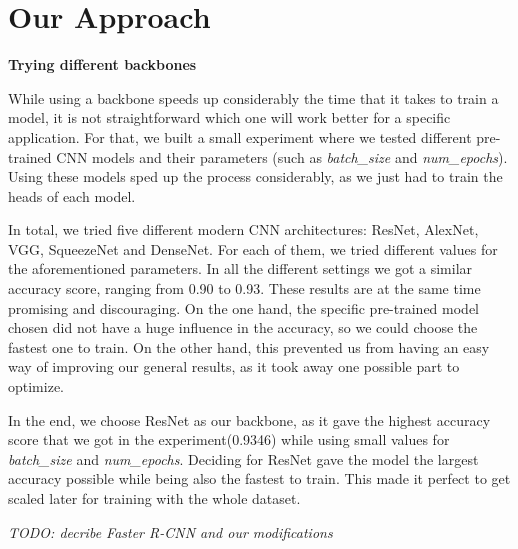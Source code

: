 \section{Our Approach}

\textbf{Trying different backbones}

While using a backbone speeds up considerably the time that it takes to train a model, it is not straightforward which one will work better for a specific application. For that, we built a small experiment where we tested different pre-trained CNN models and their parameters (such as \textit{batch_size} and \textit{num_epochs}). Using these models sped up the process considerably, as we just had to train the heads of each model.

In total, we tried five different modern CNN architectures: ResNet, AlexNet, VGG, SqueezeNet and DenseNet. For each of them, we tried different values for the aforementioned parameters. In all the different settings we got a similar accuracy score, ranging from 0.90 to 0.93. These results are at the same time promising and discouraging. On the one hand, the specific pre-trained model chosen did not have a huge influence in the accuracy, so we could choose the fastest one to train. On the other hand, this prevented us from having an easy way of improving our general results, as it took away one possible part to optimize. 

In the end, we choose ResNet as our backbone, as it gave the highest accuracy score that we got in the experiment(0.9346) while using small values for \textit{batch_size} and \textit{num_epochs}. Deciding for ResNet gave the model the largest accuracy possible while being also the fastest to train. This made it perfect to get scaled later for training with the whole dataset.

{\it TODO: decribe Faster R-CNN and our modifications}

